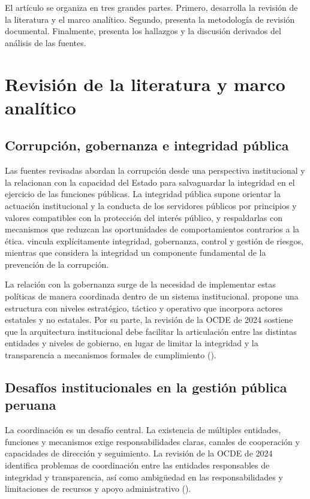 \documentclass[Afour,sageh,times]{sagej}
\begin{document}
El artículo se organiza en tres grandes partes. Primero, desarrolla la revisión de la literatura y el marco analítico. Segundo, presenta la metodología de revisión documental. Finalmente, presenta los hallazgos y la discusión derivados del análisis de las fuentes.

\section{Revisión de la literatura y marco analítico}
\subsection{Corrupción, gobernanza e integridad pública}
Las fuentes revisadas abordan la corrupción desde una perspectiva institucional y la relacionan con la capacidad del Estado para salvaguardar la integridad en el ejercicio de las funciones públicas. La integridad pública supone orientar la actuación institucional y la conducta de los servidores públicos por principios y valores compatibles con la protección del interés público, y respaldarlas con mecanismos que reduzcan las oportunidades de comportamientos contrarios a la ética. \citet{oecd2017integrity} vincula explícitamente integridad, gobernanza, control y gestión de riesgos, mientras que \citet{munive2022integridad} considera la integridad un componente fundamental de la prevención de la corrupción.

La relación con la gobernanza surge de la necesidad de implementar estas políticas de manera coordinada dentro de un sistema institucional. \citet{munive2022integridad} propone una estructura con niveles estratégico, táctico y operativo que incorpora actores estatales y no estatales. Por su parte, la revisión de la OCDE de 2024 sostiene que la arquitectura institucional debe facilitar la articulación entre las distintas entidades y niveles de gobierno, en lugar de limitar la integridad y la transparencia a mecanismos formales de cumplimiento (\citealp{oecd2024sistema}).

\subsection{Desafíos institucionales en la gestión pública peruana}
La coordinación es un desafío central. La existencia de múltiples entidades, funciones y mecanismos exige responsabilidades claras, canales de cooperación y capacidades de dirección y seguimiento. La revisión de la OCDE de 2024 identifica problemas de coordinación entre las entidades responsables de integridad y transparencia, así como ambigüedad en las responsabilidades y limitaciones de recursos y apoyo administrativo (\citealp{oecd2024sistema}).
\end{document}
